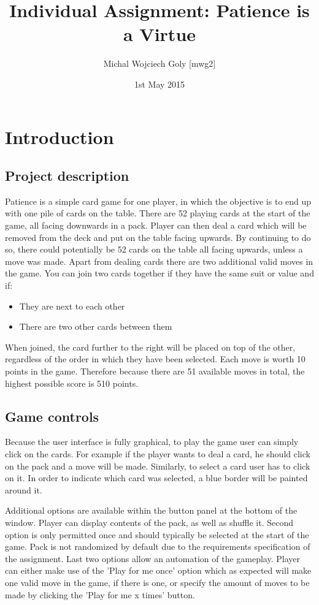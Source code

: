 \documentclass[a4paper, 12pt, titlepage]{article}
\title{Individual Assignment: Patience is a Virtue}
\author{Michal Wojciech Goly [mwg2]}
\date{1st May 2015}
\begin{document}
\maketitle
\tableofcontents
\newpage

\section{Introduction}
\subsection{Project description}
Patience is a simple card game for one player, in which the objective is to end up with 
one pile of cards on the table. There are 52 playing cards at the start of the game, all
facing downwards in a pack. Player can then deal a card which will be removed from the
deck and put on the table facing upwards. By continuing to do so, there could potentially
be 52 cards on the table all facing upwards, unless a move was made. Apart from dealing
cards there are two additional valid moves in the game. You can join two cards 
together if they have the same suit or value and if:
\begin{itemize}
	\item They are next to each other
	\item There are two other cards between them
\end{itemize}
When joined, the card further to the right will be placed on top of the other, regardless
of the order in which they have been selected. Each move is worth 10 points in the game. 
Therefore because there are 51 available moves in total, the highest possible score is
510 points. 

\subsection{Game controls} 
Because the user interface is fully graphical, to play the game user can simply click on 
the cards. For example if the player wants to deal a card, he should click on the pack 
and a move will be made. Similarly, to select a card user has to click on it. In order to
indicate which card was selected, a blue border will be painted around it.

Additional options are available within the button panel at the bottom of the window. 
Player can display contents of the pack, as well as shuffle it. Second option is only
permitted once and should typically be selected at the start of the game. Pack is not 
randomized by default due to the requirements specification of the assignment. Last two
options allow an automation of the gameplay. Player can either make use of the 'Play for
me once' option which as expected will make one valid move in the game, if there is one,
or specify the amount of moves to be made by clicking the 'Play for me x times' button.
\end{document}
